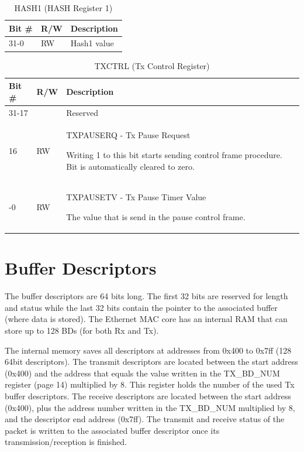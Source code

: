 \begin{xltabular}{\textwidth}{|l|l|X|}
  
  \hline
  {\bf Bit \#} & {\bf R/W} & {\bf Description} \\ \hline \hline
  \endfirsthead
  \hline
  \caption{HASH1 (HASH Register 1)}
  \endlastfoot

  31-0   & RW  & Hash1 value \\ \hline
\end{xltabular}
\label{csr_details:hash1}

\begin{xltabular}{\textwidth}{|l|l|X|}
  
  \hline
  {\bf Bit \#} & {\bf R/W} & {\bf Description} \\ \hline \hline
  \endfirsthead
  \hline
  \caption{TXCTRL (Tx Control Register)}
  \endlastfoot

  31-17   &   & Reserved \\* \nobreakhline
  16      & RW & TXPAUSERQ - Tx Pause Request

              Writing 1 to this bit starts sending control frame procedure.
              Bit is automatically cleared to zero. \\* -0    & RW & TXPAUSETV - Tx Pause Timer Value

               The value that is send in the pause control frame.\\
\end{xltabular}
\label{csr_details:txctrl}

\section{Buffer Descriptors}
\label{sec:buffer_descriptors}
The buffer descriptors are 64 bits long. The first 32 bits are reserved for
length and status while the last 32 bits contain the pointer to the associated
buffer (where data is stored). The Ethernet MAC core has an internal RAM that
can store up to 128 BDs (for both Rx and Tx). 

The internal memory saves all descriptors at addresses from 0x400 to 0x7ff (128
64bit descriptors). The transmit descriptors are located between the start
address (0x400) and the address that equals the value written in the
TX\_BD\_NUM register (page 14) multiplied by 8. This register holds the number
of the used Tx buffer descriptors. The receive descriptors are located between
the start address (0x400), plus the address number written in the TX\_BD\_NUM
multiplied by 8, and the descriptor end address (0x7ff). The transmit and
receive status of the packet is written to the associated buffer descriptor
once its transmission/reception is finished.

